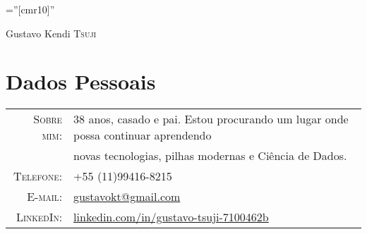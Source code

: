 \documentclass[a4paper,10pt]{article}
\begin{document}

\pagestyle{empty} %

\font\fb=''[cmr10]'' %

\par{\centering
    {\Huge Gustavo Kendi \textsc{Tsuji}
  }\bigskip\par}

\section{Dados Pessoais}

\begin{tabular}{rl}
  \textsc{Sobre mim:}   & 38 anos, casado e pai. Estou procurando um lugar onde possa continuar aprendendo \\
    & novas tecnologias, pilhas modernas e Ciência de Dados.\\
    \textsc{Telefone:}     & +55 (11)99416-8215\\
    \textsc{E-mail:}     & \href{mailto:gustavokt@gmail.com}{gustavokt@gmail.com} \\
    \textsc{LinkedIn:}     & \href{linkedin.com/in/gustavo-tsuji-7100462b}{linkedin.com/in/gustavo-tsuji-7100462b}
\end{tabular}

\end{document}

